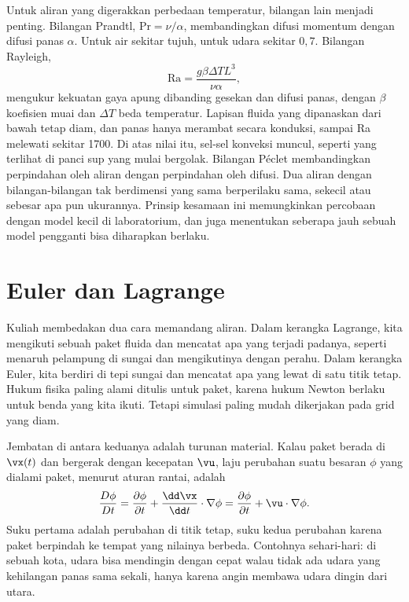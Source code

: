 Untuk aliran yang digerakkan perbedaan temperatur, bilangan lain menjadi penting. Bilangan Prandtl,
$\mathrm{Pr}=\nu/\alpha$, membandingkan difusi momentum dengan difusi panas $\alpha$. Untuk air sekitar
tujuh, untuk udara sekitar $0{,}7$. Bilangan Rayleigh,
\begin{equation}
\mathrm{Ra}=\frac{g\beta\Delta T L^3}{\nu\alpha},
\end{equation}
mengukur kekuatan gaya apung dibanding gesekan dan difusi panas, dengan $\beta$ koefisien muai dan
$\Delta T$ beda temperatur. Lapisan fluida yang dipanaskan dari bawah tetap diam, dan panas hanya
merambat secara konduksi, sampai Ra melewati sekitar 1700. Di atas nilai itu, sel-sel konveksi
muncul, seperti yang terlihat di panci sup yang mulai bergolak. Bilangan Péclet membandingkan
perpindahan oleh aliran dengan perpindahan oleh difusi. Dua aliran dengan bilangan-bilangan tak
berdimensi yang sama berperilaku sama, sekecil atau sebesar apa pun ukurannya. Prinsip kesamaan ini
memungkinkan percobaan dengan model kecil di laboratorium, dan juga menentukan seberapa jauh sebuah
model pengganti bisa diharapkan berlaku.

\section{Euler dan Lagrange}

Kuliah membedakan dua cara memandang aliran. Dalam kerangka Lagrange, kita mengikuti sebuah paket
fluida dan mencatat apa yang terjadi padanya, seperti menaruh pelampung di sungai dan mengikutinya
dengan perahu. Dalam kerangka Euler, kita berdiri di tepi sungai dan mencatat apa yang lewat di satu
titik tetap. Hukum fisika paling alami ditulis untuk paket, karena hukum Newton berlaku untuk benda
yang kita ikuti. Tetapi simulasi paling mudah dikerjakan pada grid yang diam.

Jembatan di antara keduanya adalah turunan material. Kalau paket berada di $\vx(t)$ dan bergerak dengan
kecepatan $\vu$, laju perubahan suatu besaran $\phi$ yang dialami paket, menurut aturan rantai, adalah
\begin{equation}
\frac{D\phi}{Dt}=\frac{\partial\phi}{\partial t}+\frac{\dd\vx}{\dd t}\cdot\nabla\phi=\frac{\partial\phi}{\partial t}+\vu\cdot\nabla\phi .
\end{equation}
Suku pertama adalah perubahan di titik tetap, suku kedua perubahan karena paket berpindah ke tempat yang
nilainya berbeda. Contohnya sehari-hari: di sebuah kota, udara bisa mendingin dengan cepat walau tidak
ada udara yang kehilangan panas sama sekali, hanya karena angin membawa udara dingin dari utara.

